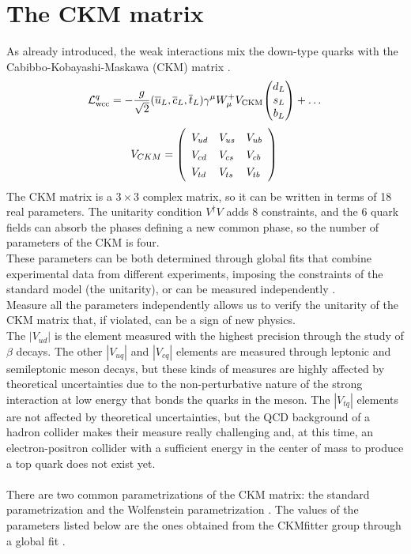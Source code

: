 \section{The CKM matrix}\label{sec:CKM}
As already introduced, the weak interactions mix the down-type quarks with the Cabibbo-Kobayashi-Maskawa (CKM) matrix \cite{Cabibbo_angle,Kobayashi1973CP-ViolationInteraction}.
\begin{equation}
    \Lg{wcc}^q=-\frac{g}{\sqrt{2}}(\overline{{{u}}}_{L},\overline{{{c}}}_{L},\overline{{{t}}}_{L})\gamma^{\mu}W_{\mu}^{+}V_{\mathrm{CKM}}\tb{d_{L}}{s_{L}}{b_L}+\dots
\end{equation}
\begin{equation}
V_{C K M}=\left(\begin{array}{l l l}{{V_{u d}}}&{{V_{u s}}}&{{V_{u b}}}\\ {{V_{c d}}}&{{V_{c s}}}&{{V_{c b}}}\\ {{V_{t d}}}&{{V_{t s}}}&{{V_{t b}}}\end{array}\right)\,
\end{equation}
The CKM matrix is a $3 \times 3$ complex matrix, so it can be written in terms of 18 real parameters. The unitarity condition $V^\dagger V$ adds 8 constraints, and the 6 quark fields can absorb the phases defining a new common phase, so the number of parameters of the CKM is four.\\
These parameters can be  both determined through global fits that combine experimental data from different experiments, imposing the constraints of the standard model (\eg the unitarity), or can be measured independently \cite{PDG_2022}.\\
Measure all the parameters independently allows us to verify the unitarity of the CKM matrix that, if violated, can be a sign of new physics.\\
The $|V_{ud}|$ is the element measured with the highest precision through  the study of $\beta$ decays. The other $|V_{uq}|$ and $|V_{cq}|$ elements are measured through leptonic and semileptonic meson decays, but these kinds of measures are highly affected by theoretical uncertainties due to the non-perturbative nature of the strong interaction at low energy that bonds the quarks in the meson.
The $|V_{tq}|$ elements are not affected by theoretical uncertainties, but the QCD background of a hadron collider makes their measure really challenging and, at this time, an electron-positron collider with a sufficient energy in the center of mass to produce a top quark does not exist yet.
\\
\\
There are two common parametrizations of the CKM matrix: the standard parametrization and the Wolfenstein parametrization \cite{PDG_2022}.
The values of the parameters listed below are the ones obtained from the CKMfitter group through a global fit \cite{Charles2005CPFactories,Hocker2001AMatrix,PDG_2022}.

